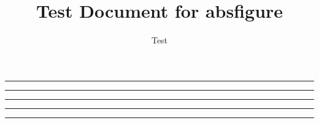 \documentclass[twocolumn]{article}
\begin{document}
\title{Test Document for \textsf{absfigure}}
\author{Test}
\maketitle
\listoffigures
\listoftables


\begin{absfigure}[page=2, pos=t, col=1]
  \centering
  \rule{0.9\columnwidth}{3cm}%
  \caption{Absolute figure: page~2, top, column~1}
  \label{fig:p2t1}
\end{absfigure}

\begin{absfigure}[page=2, pos=bottom, col=right]
  \centering
  \rule{0.9\columnwidth}{2.5cm}
  \caption{Absolute figure: page~2, bottom, right}
  \label{fig:p2b2}
\end{absfigure}

\begin{absfigure*}[page=3, pos=t]
  \centering
  \rule{0.9\textwidth}{4cm}
  \caption{Spanning absolute figure: page~3, top}
  \label{fig:p3span}
\end{absfigure*}


\begin{absfigure}[page=4, pos=b, col=2]
  \centering
  \rule{0.9\columnwidth}{2cm}
  \caption{Bottom stack A (defined first) --- page~4, col~2}
  \label{fig:stackA}
\end{absfigure}

\begin{absfigure}[page=4, pos=b, col=2]
  \centering
  \rule{0.9\columnwidth}{1.5cm}
  \caption{Bottom stack B (defined second) --- page~4, col~2}
  \label{fig:stackB}
\end{absfigure}
\end{document}
